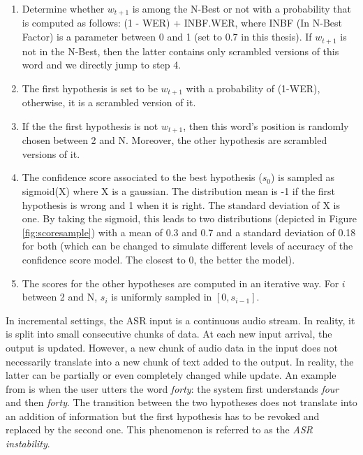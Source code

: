         \begin{enumerate}
        	\item Determine whether $w_{t+1}$ is among the N-Best or not with a probability that is computed as follows: (1 - WER) + INBF.WER, where INBF (In N-Best Factor) is a parameter between 0 and 1 (set to 0.7 in this thesis). If $w_{t+1}$ is not in the N-Best, then the latter contains only scrambled versions of this word and we directly jump to step 4.
            \item The first hypothesis is set to be $w_{t+1}$ with a probability of (1-WER), otherwise, it is a scrambled version of it.
            \item If the the first hypothesis is not $w_{t+1}$, then this word's position is randomly chosen between 2 and N. Moreover, the other hypothesis are scrambled versions of it.
            \item The confidence score associated to the best hypothesis ($s_0$) is sampled as sigmoid(X) where X is a gaussian. The distribution mean is -1 if the first hypothesis is wrong and 1 when it is right. The standard deviation of X is one. By taking the sigmoid, this leads to two distributions (depicted in Figure \ref{fig:scoresample}) with a mean of 0.3 and 0.7 and a standard deviation of 0.18 for both (which can be changed to simulate different levels of accuracy of the confidence score model. The closest to 0, the better the model).
            \item The scores for the other hypotheses are computed in an iterative way. For $i$ between 2 and N, $s_i$ is uniformly sampled in $[0,s_{i-1}]$.
        \end{enumerate}
        
        In incremental settings, the ASR input is a continuous audio stream. In reality, it is split into small consecutive chunks of data. At each new input arrival, the output is updated. However, a new chunk of audio data in the input does not necessarily translate into a new chunk of text added to the output. In reality, the latter can be partially or even completely changed while update. An example from \cite{Schlangen2011} is when the user utters the word \textit{forty}: the system first understands \textit{four} and then \textit{forty}. The transition between the two hypotheses does not translate into an addition of information but the first hypothesis has to be revoked and replaced by the second one. This phenomenon is referred to as the \textit{ASR instability}.
        
